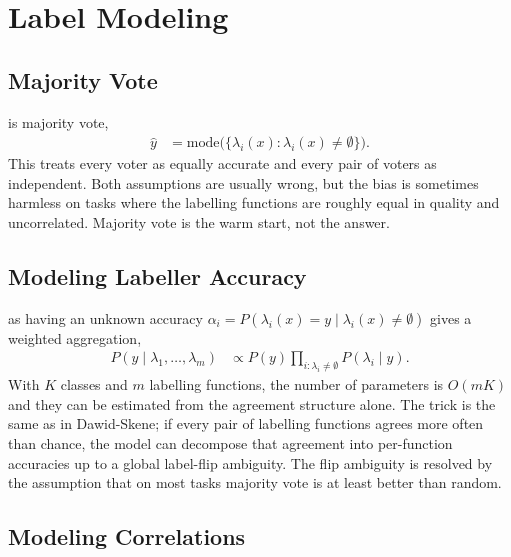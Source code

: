\newpage
\section{Label Modeling}


\subsection{Majority Vote}

 is majority vote,
\begin{align*}
    \hat{y} &= \mathrm{mode}\bigl(\{\lambda_i(x) : \lambda_i(x) \neq \emptyset\}\bigr).
\end{align*}
This treats every voter as equally accurate and every pair of voters as independent. Both assumptions are usually wrong, but the bias is sometimes harmless on tasks where the labelling functions are roughly equal in quality and uncorrelated. Majority vote is the warm start, not the answer.

\subsection{Modeling Labeller Accuracy}

 as having an unknown accuracy $\alpha_i = P(\lambda_i(x) = y \mid \lambda_i(x) \neq \emptyset)$ gives a weighted aggregation,
\begin{align*}
    P(y \mid \lambda_1, \ldots, \lambda_m) &\propto P(y) \prod_{i: \lambda_i \neq \emptyset} P(\lambda_i \mid y).
\end{align*}
With $K$ classes and $m$ labelling functions, the number of parameters is $O(mK)$ and they can be estimated from the agreement structure alone. The trick is the same as in Dawid-Skene; if every pair of labelling functions agrees more often than chance, the model can decompose that agreement into per-function accuracies up to a global label-flip ambiguity. The flip ambiguity is resolved by the assumption that on most tasks majority vote is at least better than random.

\subsection{Modeling Correlations}

